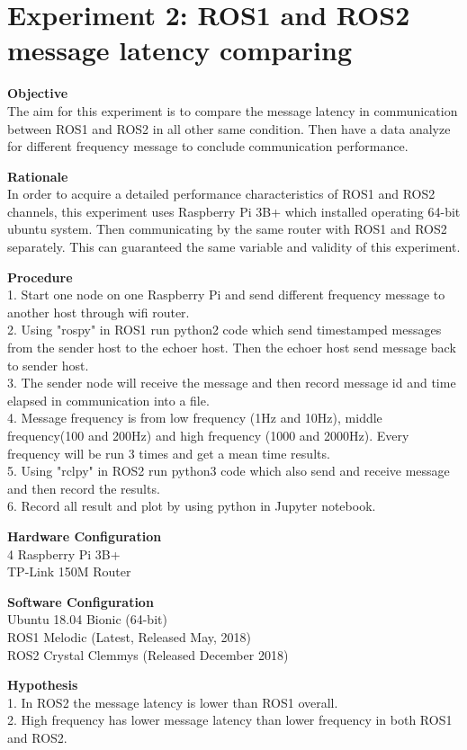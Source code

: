 \documentclass{mproj}
\begin{document}
\section{Experiment 2: ROS1 and ROS2 message latency comparing}
\textbf{Objective} \\
The aim for this experiment is to compare the message latency in communication between ROS1 and ROS2 in all other same condition. Then have a data analyze for different frequency message to conclude communication performance. 

\textbf{Rationale} \\
In order to acquire a detailed performance characteristics of ROS1 and ROS2 channels, this experiment uses Raspberry Pi 3B+ which installed operating 64-bit ubuntu system. Then communicating by the same router with ROS1 and ROS2 separately. This can guaranteed the same variable and validity of this experiment.

\textbf{Procedure} \\
1. Start one node on one Raspberry Pi and send different frequency message to another host through wifi router. \\
2. Using "rospy" in ROS1 run python2 code which send timestamped messages from the sender host to the echoer host. Then the echoer host send message back to sender host. \\
3. The sender node will receive the message and then record message id and time elapsed in communication into a file.  \\
4. Message frequency is from low frequency (1Hz and 10Hz), middle frequency(100 and 200Hz) and high frequency (1000 and 2000Hz). Every frequency will be run 3 times and get a mean time results.\\
5. Using "rclpy" in ROS2 run python3 code which also send and receive message and then record the results. \\
6. Record all result and plot by using python in Jupyter notebook.

\textbf{Hardware Configuration} \\
4 Raspberry Pi 3B+ \\
TP-Link 150M Router

\textbf{Software Configuration} \\
Ubuntu 18.04 Bionic (64-bit)\\
ROS1 Melodic (Latest, Released May, 2018) \\
ROS2 Crystal Clemmys (Released December 2018)

\textbf{Hypothesis} \\
1. In ROS2 the message latency is lower than ROS1 overall.\\
2. High frequency has lower message latency than lower frequency in both ROS1 and ROS2.
\end{document}
